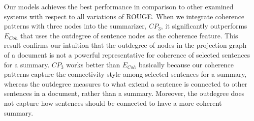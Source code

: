 Our models achieves the best performance in comparison to other examined systems with respect to all variations of ROUGE. 
When we integrate coherence patterns with three nodes into the summarizer, $CP_3$, it significantly outperforms $E_{Coh}$ that uses the outdegree of sentence nodes as the coherence feature. 
This result confirms our intuition that the outdegree of nodes in the projection graph of a document is not a powerful representative for coherence of selected sentences for a summary. 
$CP_3$ works better than $E_{Coh}$ basically because our coherence patterns capture the connectivity style among selected sentences for a summary, whereas
the outdegree measures to what extend a sentence is connected to other sentences  in a document, rather than a summary. 
Moreover, the outdegree does not capture how sentences should be connected to have a more coherent summary. 

